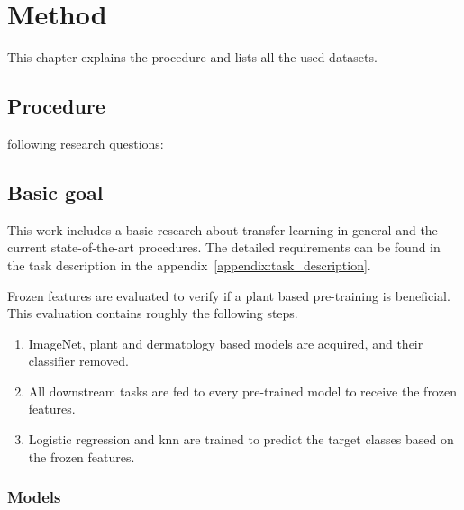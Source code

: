 \chapter{Method}
This chapter explains the procedure and lists all the used datasets.

\section{Procedure}

following
research questions:

\section{Basic goal}
This work includes a basic research about transfer learning in general and the current state-of-the-art procedures. 
The detailed requirements can be found in the task description in the appendix~\ref{appendix:task_description}.



Frozen features are evaluated to verify if a plant based pre-training is beneficial. This evaluation contains roughly the following steps.
\begin{enumerate}
    \item ImageNet, plant and dermatology based models are acquired, and their classifier removed.
    \item All downstream tasks are fed to every pre-trained model to receive the frozen features.
    \item Logistic regression and \gls{knn} are trained to predict the target classes based on the frozen features.
\end{enumerate}
\subsection{Models}

